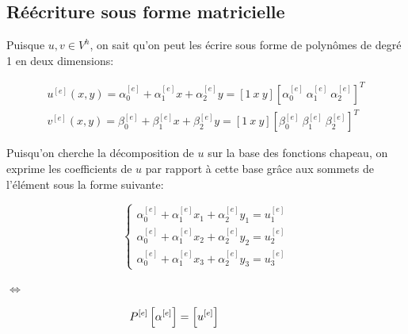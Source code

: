 \documentclass{article}
\begin{document}
\subsection{Réécriture sous forme matricielle}

Puisque $u,v \in V^h$, on sait qu'on peut les écrire sous forme
de polynômes de degré 1 en deux dimensions:

\begin{align}
    u^{[e]}(x,y) = \alpha_0^{[e]} + \alpha_1^{[e]} x + \alpha_2^{[e]} y
    = \left[1 \ x \ y\right]
    \left[ \alpha_0^{[e]} \ \alpha_1^{[e]} \ \alpha_2^{[e]} \right]^T \\
    v^{[e]}(x,y) = \beta_0^{[e]} + \beta_1^{[e]} x + \beta_2^{[e]} y
    = \left[1 \ x \ y\right]
    \left[ \beta_0^{[e]} \ \beta_1^{[e]} \ \beta_2^{[e]} \right]^T
\end{align}

Puisqu'on cherche la décomposition de $u$ sur la 
base des fonctions chapeau, on exprime les coefficients de $u$
par rapport à cette base grâce aux sommets de l'élément
sous la forme suivante:

\vspace{0.5cm}

\begin{minipage}{0.45\textwidth}
    \begin{equation*}\begin{cases}
        \alpha_0^{[e]} + \alpha_1^{[e]} x_1
        + \alpha_2^{[e]} y_1 = u^{[e]}_1 \\
        \alpha_0^{[e]} + \alpha_1^{[e]} x_2
        + \alpha_2^{[e]} y_2 = u^{[e]}_2 \\
        \alpha_0^{[e]} + \alpha_1^{[e]} x_3
        + \alpha_2^{[e]} y_3 = u^{[e]}_3
    \end{cases}\end{equation*}
\end{minipage}
\begin{minipage}{0.01\textwidth}
    \centering
    $\Leftrightarrow$
\end{minipage}
\begin{minipage}{0.45\textwidth}
    
    \begin{equation}
        \hspace{-2cm} P^{[e]} \left[\alpha^{[e]}\right] = \left[u^{[e]}\right]
        \label{eq:p_alpha_u}
    \end{equation}
\end{minipage}

\vspace{5mm}
\end{document}
